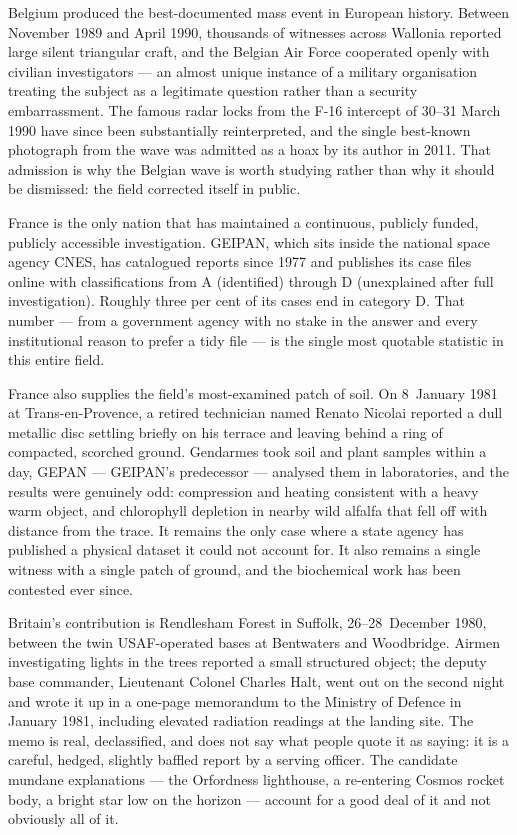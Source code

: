 Belgium produced the best-documented mass event in European history. Between November
1989 and April 1990, thousands of witnesses across Wallonia reported large silent
triangular craft, and the Belgian Air Force cooperated openly with civilian
investigators --- an almost unique instance of a military organisation treating the
subject as a legitimate question rather than a security embarrassment. The famous radar
locks from the F-16 intercept of 30--31 March 1990 have since been substantially
reinterpreted, and the single best-known photograph from the wave was admitted as a hoax
by its author in 2011. That admission is why the Belgian wave is worth studying rather
than why it should be dismissed: the field corrected itself in public.

France is the only nation that has maintained a continuous, publicly funded, publicly
accessible investigation. GEIPAN, which sits inside the national space agency CNES,
has catalogued reports since 1977 and publishes its case files online with
classifications from A (identified) through D (unexplained after full investigation).
Roughly three per cent of its cases end in category D. That number --- from a
government agency with no stake in the answer and every institutional reason to prefer a
tidy file --- is the single most quotable statistic in this entire field.

France also supplies the field's most-examined patch of soil. On 8~January 1981 at
Trans-en-Provence, a retired technician named Renato Nicolai reported a dull metallic disc
settling briefly on his terrace and leaving behind a ring of compacted, scorched ground.
Gendarmes took soil and plant samples within a day, GEPAN --- GEIPAN's predecessor ---
analysed them in laboratories, and the results were genuinely odd: compression and heating
consistent with a heavy warm object, and chlorophyll depletion in nearby wild alfalfa that
fell off with distance from the trace. It remains the only case where a state agency has
published a physical dataset it could not account for. It also remains a single witness with
a single patch of ground, and the biochemical work has been contested ever since.

Britain's contribution is Rendlesham Forest in Suffolk, 26--28~December 1980, between the
twin USAF-operated bases at Bentwaters and Woodbridge. Airmen investigating lights in the
trees reported a small structured object; the deputy base commander, Lieutenant Colonel
Charles Halt, went out on the second night and wrote it up in a one-page memorandum to the
Ministry of Defence in January 1981, including elevated radiation readings at the landing
site. The memo is real, declassified, and does not say what people quote it as saying: it is
a careful, hedged, slightly baffled report by a serving officer. The candidate mundane
explanations --- the Orfordness lighthouse, a re-entering Cosmos rocket body, a bright star
low on the horizon --- account for a good deal of it and not obviously all of it.

